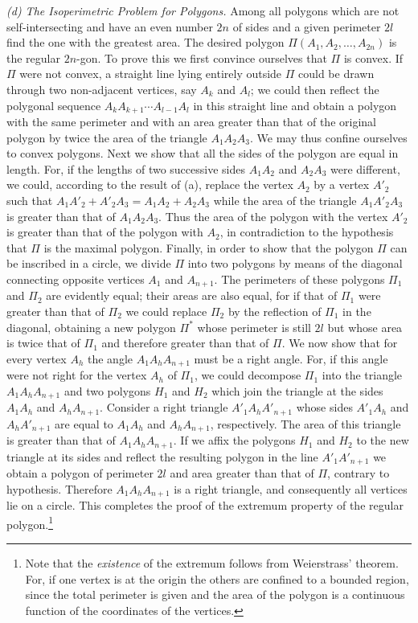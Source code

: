 \emph{(d) The Isoperimetric Problem for Polygons.} Among all polygons which are not self-intersecting and have an even number $2n$ of sides and a given perimeter $2l$ find the one with the greatest area. The desired polygon $\Pi(A_1,A_2,\ldots,A_{2n})$ is the regular $2n$-gon. To prove this we first convince ourselves that $\Pi$ is convex. If $\Pi$ were not convex, a straight line lying entirely outside $\Pi$ could be drawn through two non-adjacent vertices, say $A_k$ and $A_l$; we could then reflect the polygonal sequence $A_kA_{k+1}\cdots A_{l-1}A_l$ in this straight line and obtain a polygon with the same perimeter and with an area greater than that of the original polygon by twice the area of the triangle $A_1A_2A_3$. We may thus confine ourselves to convex polygons. Next we show that all the sides of the polygon are equal in length. For, if the lengths of two successive sides $A_1A_2$ and $A_2A_3$ were different, we could, according to the result of (a), replace the vertex $A_2$ by a vertex $A'_2$ such that $A_1A'_2+A'_2A_3=A_1A_2+A_2A_3$ while the area of the triangle $A_1A'_2A_3$ is greater than that of $A_1A_2A_3$. Thus the area of the polygon with the vertex $A'_2$ is greater than that of the polygon with $A_2$, in contradiction to the hypothesis that $\Pi$ is the maximal polygon. Finally, in order to show that the polygon $\Pi$ can be inscribed in a circle, we divide $\Pi$ into two polygons by means of the diagonal connecting opposite vertices $A_1$ and $A_{n+1}$. The perimeters of these polygons $\Pi_1$ and $\Pi_2$ are evidently equal; their areas are also equal, for if that of $\Pi_1$ were greater than that of $\Pi_2$ we could replace $\Pi_2$ by the reflection of $\Pi_1$ in the diagonal, obtaining a new polygon $\Pi^*$ whose perimeter is still $2l$ but whose area is twice that of $\Pi_1$ and therefore greater than that of $\Pi$. We now show that for every vertex $A_h$ the angle $A_1A_hA_{n+1}$ must be a right angle. For, if this angle were not right for the vertex $A_h$ of $\Pi_1$, we could decompose $\Pi_1$ into the triangle $A_1A_hA_{n+1}$ and two polygons $H_1$ and $H_2$ which join the triangle at the sides $A_1A_h$ and $A_hA_{n+1}$. Consider a right triangle $A'_1A_hA'_{n+1}$ whose sides $A'_1A_h$ and $A_hA'_{n+1}$ are equal to $A_1A_h$ and $A_hA_{n+1}$, respectively. The area of this triangle is greater than that of $A_1A_hA_{n+1}$. If we affix the polygons $H_1$ and $H_2$ to the new triangle at its sides and reflect the resulting polygon in the line $A'_1A'_{n+1}$ we obtain a polygon of perimeter $2l$ and area greater than that of $\Pi$, contrary to hypothesis. Therefore $A_1A_hA_{n+1}$ is a right triangle, and consequently all vertices lie on a circle. This completes the proof of the extremum property of the regular polygon.\footnote{Note that the \emph{existence} of the extremum follows from Weierstrass' theorem. For, if one vertex is at the origin the others are confined to a bounded region, since the total perimeter is given and the area of the polygon is a continuous function of the coordinates of the vertices.}

